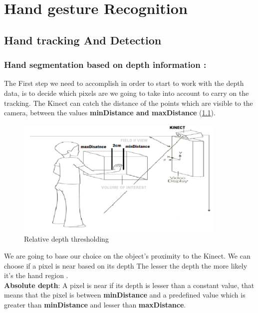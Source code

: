 
\chapter{Hand gesture Recognition} \label{hgr}




\section{Hand tracking  And Detection}

\subsection{Hand segmentation based on depth information :} \label{depth}

The First step we need to accomplish in order to start to work with the depth data, is to decide which pixels are we going to take into account to carry on the tracking. The Kinect can catch the distance of the points which are visible to the camera, between the values \textbf{minDistance and maxDistance} (\ref{fig:cam8}).

\begin{figure}[H]
\centering
\includegraphics[width=0.9\textwidth]{img/mindistance.png}
\caption{Relative depth thresholding }
\label{fig:cam8}
\end{figure}

We are going to base our choice on the object’s proximity to the Kinect. We can choose if a pixel is near based on its depth  The lesser the depth the more likely it’s the hand region .\\

\textbf{ Absolute depth}: A pixel is near if its depth is lesser than a constant value, that means that the pixel is between \textbf{minDistance }and a predefined value which is greater than \textbf{minDistance }and lesser than \textbf{maxDistance}.\\

